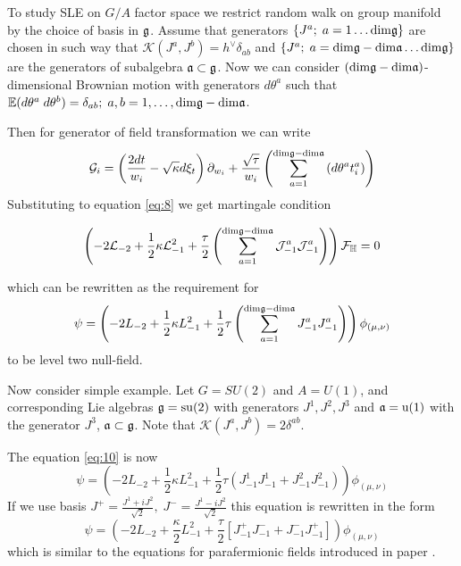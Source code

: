 To study SLE on $G/A$ factor space we restrict random walk on group manifold by the choice of basis in $\mathfrak{g}$. Assume that generators $\{J^{a};\; a=1\dots \mathrm{dim}\mathfrak{g}\}$ are chosen in such way that $\mathcal{K}(J^{a},J^{b})=h^{\vee}\delta_{ab}$ and $\{J^{a};\; a=\mathrm{dim}\mathfrak{g}-\mathrm{dim}\mathfrak{a}\dots \mathrm{dim}\mathfrak{g}\}$ are the generators of subalgebra $\mathfrak{a}\subset \mathfrak{g}$. Now we can consider $(\mathrm{dim}\mathfrak{g}-\mathrm{dim}\mathfrak{a})$-dimensional Brownian motion with generators $d\theta^{a}$ such that $\mathbb{E}(d\theta^{a} \; d\theta^{b})=\delta_{ab};\; a,b=1,\dots,\mathrm{dim}\mathfrak{g}-\mathrm{dim}\mathfrak{a}$.

Then for generator of field transformation we can write 
\begin{equation}
  \mathcal{G}_{i}=\left(\frac{2dt}{w_{i}}-\sqrt{\kappa} d\xi_{t}\right) \partial_{w_{i}}+\frac{\sqrt{\tau}}{w_{i}}\left(\sum_{a=1}^{\mathrm{dim}\mathfrak{g}-\mathrm{dim}\mathfrak{a}}\left(d \theta ^{a} t^{a}_{i}\right)\right)
\label{eq:5}
\end{equation}
Substituting to equation \eqref{eq:8} we get martingale condition

\begin{equation}
  \left(-2 \mathcal{L}_{-2}+\frac{1}{2}\kappa \mathcal{L}_{-1}^{2}+\frac{\tau}{2}\left( \sum_{a=1}^{\mathrm{dim}\mathfrak{g}-\mathrm{dim}\mathfrak{a}} \mathcal{J}^{a}_{-1} \mathcal{J}^{a}_{-1}\right)\right)        \mathcal{F}_{\mathbb{H}}=0
\label{eq:9}
\end{equation}

which can be rewritten as the requirement for
\begin{equation}
  \psi=\left(-2L_{-2}+\frac{1}{2}\kappa L_{-1}^{2}+\frac{1}{2}\tau \left(\sum_{a=1}^{\mathrm{dim}\mathfrak{g}-\mathrm{dim}\mathfrak{a}}J^{a}_{-1}J^{a}_{-1}\right)\right) \phi_{(\mu,\nu)}
\label{eq:10}
\end{equation}
to be level two null-field. 

Now consider simple example. Let $G=SU(2)$ and $A=U(1)$, and corresponding Lie algebras $\mathfrak{g}=\mathrm{su}(2)$
with generators $J^{1},J^{2},J^{3}$ and $\mathfrak{a}=\mathrm{u}(1)$ with the generator $J^{3}$, $\mathfrak{a}\subset\mathfrak{g}$. Note that $\mathcal{K}(J^{a},J^{b})=2\delta^{ab}$. 

 The equation \eqref{eq:10} is now
\begin{equation}
  \label{eq:11}
  \psi=\left(-2L_{-2}+\frac{1}{2}\kappa L_{-1}^{2}+\frac{1}{2}\tau \left(J^{1}_{-1}J^{1}_{-1}+J^{2}_{-1}J^{2}_{-1}\right)\right) \phi_{(\mu,\nu)}
\end{equation}
If we use basis $J^{+}=\frac{J^{1}+iJ^{2}}{\sqrt{2}},\; J^{-}=\frac{J^{1}-iJ^{2}}{\sqrt{2}}$ this equation is rewritten in the form
\begin{equation}
 \psi= \left(-2 L_{-2}+\frac{\kappa}{2}L_{-1}^{2}+\frac{\tau}{2}\left[J^{+}_{-1}J^{-}_{-1}+J^{-}_{-1}J^{+}_{-1}\right]\right) \phi_{(\mu,\nu)}
\label{eq:12}
\end{equation}
which is similar to the equations for parafermionic fields introduced in paper \cite{santachiara2008sle}.

